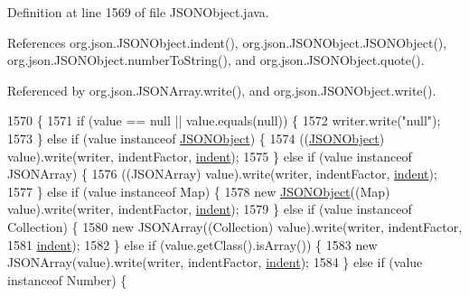 Definition at line 1569 of file J\-S\-O\-N\-Object.\-java.



References org.\-json.\-J\-S\-O\-N\-Object.\-indent(), org.\-json.\-J\-S\-O\-N\-Object.\-J\-S\-O\-N\-Object(), org.\-json.\-J\-S\-O\-N\-Object.\-number\-To\-String(), and org.\-json.\-J\-S\-O\-N\-Object.\-quote().



Referenced by org.\-json.\-J\-S\-O\-N\-Array.\-write(), and org.\-json.\-J\-S\-O\-N\-Object.\-write().


\begin{DoxyCode}
1570                                                                             \{
1571         \textcolor{keywordflow}{if} (value == null || value.equals(null)) \{
1572             writer.write(\textcolor{stringliteral}{"null"});
1573         \} \textcolor{keywordflow}{else} \textcolor{keywordflow}{if} (value instanceof \hyperlink{classorg_1_1json_1_1_j_s_o_n_object_a7c17e59daff74ce50c6677c6f5da233d}{JSONObject}) \{
1574             ((\hyperlink{classorg_1_1json_1_1_j_s_o_n_object_a7c17e59daff74ce50c6677c6f5da233d}{JSONObject}) value).write(writer, indentFactor, \hyperlink{classorg_1_1json_1_1_j_s_o_n_object_ade4aa5090d5636a0318db80ba32764be}{indent});
1575         \} \textcolor{keywordflow}{else} \textcolor{keywordflow}{if} (value instanceof JSONArray) \{
1576             ((JSONArray) value).write(writer, indentFactor, \hyperlink{classorg_1_1json_1_1_j_s_o_n_object_ade4aa5090d5636a0318db80ba32764be}{indent});
1577         \} \textcolor{keywordflow}{else} \textcolor{keywordflow}{if} (value instanceof Map) \{
1578             \textcolor{keyword}{new} \hyperlink{classorg_1_1json_1_1_j_s_o_n_object_a7c17e59daff74ce50c6677c6f5da233d}{JSONObject}((Map) value).write(writer, indentFactor, 
      \hyperlink{classorg_1_1json_1_1_j_s_o_n_object_ade4aa5090d5636a0318db80ba32764be}{indent});
1579         \} \textcolor{keywordflow}{else} \textcolor{keywordflow}{if} (value instanceof Collection) \{
1580             \textcolor{keyword}{new} JSONArray((Collection) value).write(writer, indentFactor,
1581                     \hyperlink{classorg_1_1json_1_1_j_s_o_n_object_ade4aa5090d5636a0318db80ba32764be}{indent});
1582         \} \textcolor{keywordflow}{else} \textcolor{keywordflow}{if} (value.getClass().isArray()) \{
1583             \textcolor{keyword}{new} JSONArray(value).write(writer, indentFactor, \hyperlink{classorg_1_1json_1_1_j_s_o_n_object_ade4aa5090d5636a0318db80ba32764be}{indent});
1584         \} \textcolor{keywordflow}{else} \textcolor{keywordflow}{if} (value instanceof Number) \{

\end{DoxyCode}
